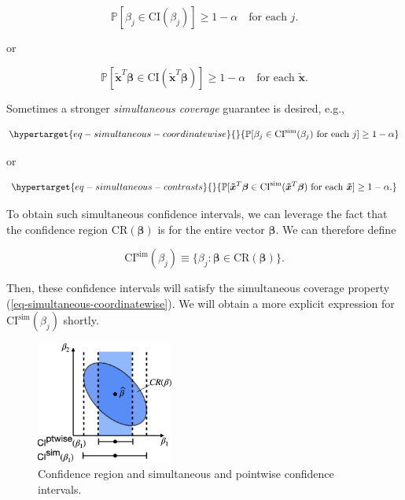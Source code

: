 \documentclass[
  11pt,
  letterpaper,
  oneside]{book}
\theoremstyle{plain}
\theoremstyle{plain}
\theoremstyle{definition}
\theoremstyle{definition}
\theoremstyle{plain}
\theoremstyle{remark}
\begin{document}
\[
\mathbb{P}[\beta_j \in \text{CI}(\beta_j)] \geq 1-\alpha \quad \text{for each } j.
\]

or

\[
\mathbb{P}[\boldsymbol{\tilde x}^T \boldsymbol{\beta} \in \text{CI}(\boldsymbol{\tilde x}^T \boldsymbol{\beta})] \geq 1-\alpha \quad \text{for each } \boldsymbol{\tilde x}.
\]

Sometimes a stronger \emph{simultaneous coverage} guarantee is desired,
e.g.,

\begin{equation}\protect\hypertarget{eq-simultaneous-coordinatewise}{}{
\mathbb{P}[\beta_j \in \text{CI}^{\text{sim}}(\beta_j) \ \text{for each } j] \geq 1-\alpha
}\label{eq-simultaneous-coordinatewise}\end{equation}

or

\begin{equation}\protect\hypertarget{eq-simultaneous-contrasts}{}{
\mathbb{P}[\boldsymbol{\tilde x}^T \boldsymbol{\beta} \in \text{CI}^{\text{sim}}(\boldsymbol{\tilde x}^T \boldsymbol{\beta}) \ \text{for each } \boldsymbol{\tilde x}] \geq 1-\alpha.
}\label{eq-simultaneous-contrasts}\end{equation}

To obtain such simultaneous confidence intervals, we can leverage the
fact that the confidence region \(\text{CR}(\boldsymbol \beta)\) is for
the entire vector \(\boldsymbol{\beta}\). We can therefore define

\[
\text{CI}^{\text{sim}}(\beta_j) \equiv \{\beta_j: \boldsymbol{\beta} \in \text{CR}(\boldsymbol{\beta}) \}.
\]

Then, these confidence intervals will satisfy the simultaneous coverage
property (\ref{eq-simultaneous-coordinatewise}). We will obtain a more
explicit expression for \(\text{CI}^{\text{sim}}(\beta_j)\) shortly.

\begin{figure}

{\centering \includegraphics[width=0.4\textwidth,height=\textheight]{figures/confidence-regions-simultaneous-intervals.jpg}

}

\caption{\label{fig-confidence-region}Confidence region and simultaneous
and pointwise confidence intervals.}

\end{figure}
\end{document}
